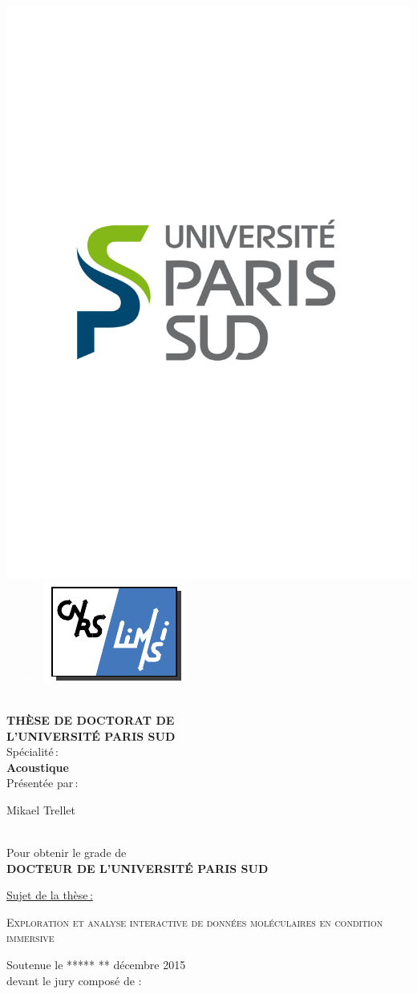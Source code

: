\begin{titlepage}

\includegraphics[height=2.cm]{./figures/LogoUPSUD.pdf}\hfill \textcolor{white}{Gnowê}
\includegraphics[height=2.cm]{./figures/limsilogo_vectoriel.pdf}\hfill
\\
\\



\begin{center}
 \textbf{THÈSE DE DOCTORAT DE\\ L'UNIVERSITÉ PARIS SUD\\}
Spécialité\,:\\
\textbf{Acoustique}\\ 
Présentée par\,:\\ 
\begin{LARGE}
Mikael Trellet\end{LARGE}\\
Pour obtenir le grade de\\
\textbf{DOCTEUR DE L'UNIVERSITÉ PARIS SUD}
\end{center}

\noindent \underline{Sujet de la thèse\,:}\\
\begin{center}
\begin{Large}
{\textsc{Exploration et analyse interactive de données moléculaires en condition immersive}}
\end{Large}
\end{center}

Soutenue le ***** ** décembre 2015\\

devant le jury composé de :\\
\begin{center}
	\begin{tabular}{l l l}
	

\end{tabular}
\end{center}
\end{titlepage}
